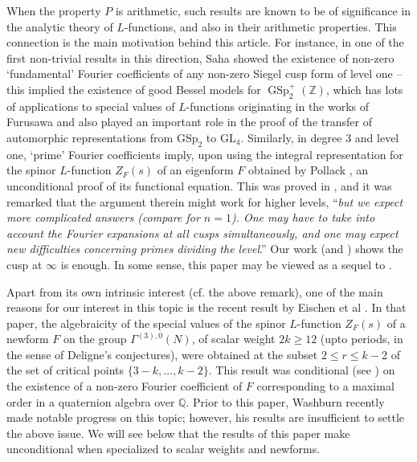 \documentclass[11pt]{amsart}
\numberwithin{equation}{section}
\newcommand{\mrm}{\mathrm} %
\newcommand*{\GSp}[2]{\operatorname{GSp}^{+}_{#1}(#2)}
\newcommand{\z}{\mathbb{Z}}
\newcommand{\Q}{\mathbb{Q}}
\begin{document}
When the property $P$ is arithmetic, such results are known to be of significance in the analytic theory of $L$-functions, and also in their arithmetic properties. This connection is the main motivation behind this article. For instance, in one of the first non-trivial results in this direction, Saha \cite{saha2013siegel} showed the existence of non-zero `fundamental' Fourier coefficients of any non-zero Siegel cusp form of level one -- this implied the existence of good Bessel models for $\GSp{2}{\z}$, which has lots of applications to special values of $L$-functions originating in the works of Furusawa and also played an important role in the proof of the transfer of automorphic representations from $\mrm{GSp}_2$ to $\mrm{GL}_4$. 
Similarly, in degree $3$ and level one, `prime' Fourier coefficients imply, upon using the integral representation for the spinor $L$-function $Z_F(s)$ of an eigenform $F$ obtained by Pollack \cite{pollack2017spin}, an unconditional proof of its functional equation. This was proved in \cite{boche-das}, and it was remarked that the argument therein might work for higher levels, ``{\it but we expect more complicated answers (compare \cite{anamby2024non} for $n = 1$). One may have to take into account the Fourier expansions at all cusps simultaneously, and one may expect new difficulties concerning primes dividing the level}.'' Our work (and \cite{washburn2025certain}) shows the cusp at $\infty$ is enough. In some sense, this paper may be viewed as a sequel to \cite{boche-das}.

Apart from its own intrinsic interest (cf. the above remark), one of the main reasons for our interest in this topic is the recent result by Eischen et al \cite{eischen2024algebraicity}. In that paper, the algebraicity of the special values of the spinor $L$-function $Z_F(s)$ of a newform $F$  on the group $\Gamma^{(3),0}(N)$, of scalar weight $2k \ge 12$ (upto periods, in the sense of Deligne's conjectures), were obtained at the subset  $2 \le r \le k-2$ of the set of critical points $\{3-k,\ldots, k-2\}$. This result was conditional (see  \cite[Condition~1.1.1]{eischen2024algebraicity}) on the existence of a non-zero Fourier coefficient of $F$ corresponding to a maximal order in a quaternion algebra over $\Q$. Prior to this paper, Washburn \cite{washburn2025certain} recently made notable progress on this topic; however, his results are insufficient to settle the above issue.  We will see below that the results of this paper make \cite{eischen2024algebraicity} unconditional when specialized to scalar weights and newforms.
\end{document}
